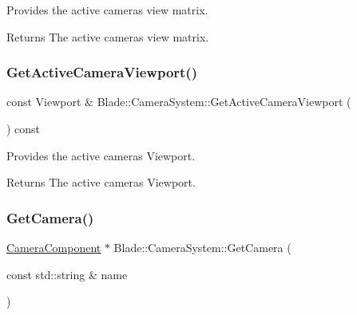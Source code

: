 Provides the active camera\textquotesingle{}s view matrix. 

\begin{DoxyReturn}{Returns}
The active camera\textquotesingle{}s view matrix. 
\end{DoxyReturn}
\mbox{\label{class_blade_1_1_camera_system_aff681b50b700fb56721fcd844c961e3f}} 
\subsubsection{\texorpdfstring{Get\+Active\+Camera\+Viewport()}{GetActiveCameraViewport()}}
{\footnotesize\ttfamily const Viewport \& Blade\+::\+Camera\+System\+::\+Get\+Active\+Camera\+Viewport (\begin{DoxyParamCaption}{ }\end{DoxyParamCaption}) const\hspace{0.3cm}{\ttfamily [noexcept]}}



Provides the active camera\textquotesingle{}s Viewport. 

\begin{DoxyReturn}{Returns}
The active camera\textquotesingle{}s Viewport. 
\end{DoxyReturn}
\mbox{\label{class_blade_1_1_camera_system_aa6fcc138bf6920081fb7a36ddf362894}} 
\subsubsection{\texorpdfstring{Get\+Camera()}{GetCamera()}}
{\footnotesize\ttfamily \hyperlink{class_blade_1_1_camera_component}{Camera\+Component} $\ast$ Blade\+::\+Camera\+System\+::\+Get\+Camera (\begin{DoxyParamCaption}\item[{const std\+::string \&}]{name }\end{DoxyParamCaption})\hspace{0.3cm}{\ttfamily [noexcept]}}



